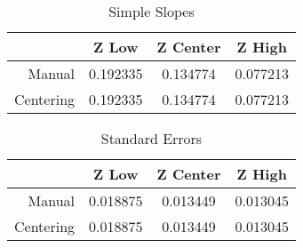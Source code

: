 \begin{table}[ht]
\centering
\begin{tabular}{|r|c|c|c|}
  \hline
 & Z Low & Z Center & Z High \\ 
  \hline
Manual & 0.192335 & 0.134774 & 0.077213 \\ 
  Centering & 0.192335 & 0.134774 & 0.077213 \\ 
   \hline
\end{tabular}
\caption{Simple Slopes} 
\end{table}%
\begin{table}[ht]
\centering
\begin{tabular}{|r|c|c|c|}
  \hline
 & Z Low & Z Center & Z High \\ 
  \hline
Manual & 0.018875 & 0.013449 & 0.013045 \\ 
  Centering & 0.018875 & 0.013449 & 0.013045 \\ 
   \hline
\end{tabular}
\caption{Standard Errors} 
\end{table}